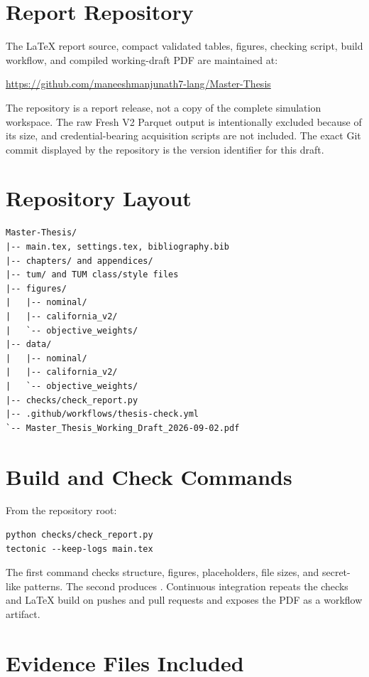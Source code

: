 \section{Report Repository}

The LaTeX report source, compact validated tables, figures, checking script, build workflow, and compiled working-draft PDF are maintained at:

\begin{center}
\url{https://github.com/maneeshmanjunath7-lang/Master-Thesis}
\end{center}

The repository is a report release, not a copy of the complete simulation workspace. The raw Fresh V2 Parquet output is intentionally excluded because of its size, and credential-bearing acquisition scripts are not included. The exact Git commit displayed by the repository is the version identifier for this draft.

\section{Repository Layout}

\begin{lstlisting}
Master-Thesis/
|-- main.tex, settings.tex, bibliography.bib
|-- chapters/ and appendices/
|-- tum/ and TUM class/style files
|-- figures/
|   |-- nominal/
|   |-- california_v2/
|   `-- objective_weights/
|-- data/
|   |-- nominal/
|   |-- california_v2/
|   `-- objective_weights/
|-- checks/check_report.py
|-- .github/workflows/thesis-check.yml
`-- Master_Thesis_Working_Draft_2026-09-02.pdf
\end{lstlisting}

\section{Build and Check Commands}

From the repository root:

\begin{lstlisting}
python checks/check_report.py
tectonic --keep-logs main.tex
\end{lstlisting}

The first command checks structure, figures, placeholders, file sizes, and secret-like patterns. The second produces . Continuous integration repeats the checks and LaTeX build on pushes and pull requests and exposes the PDF as a workflow artifact.

\section{Evidence Files Included}

